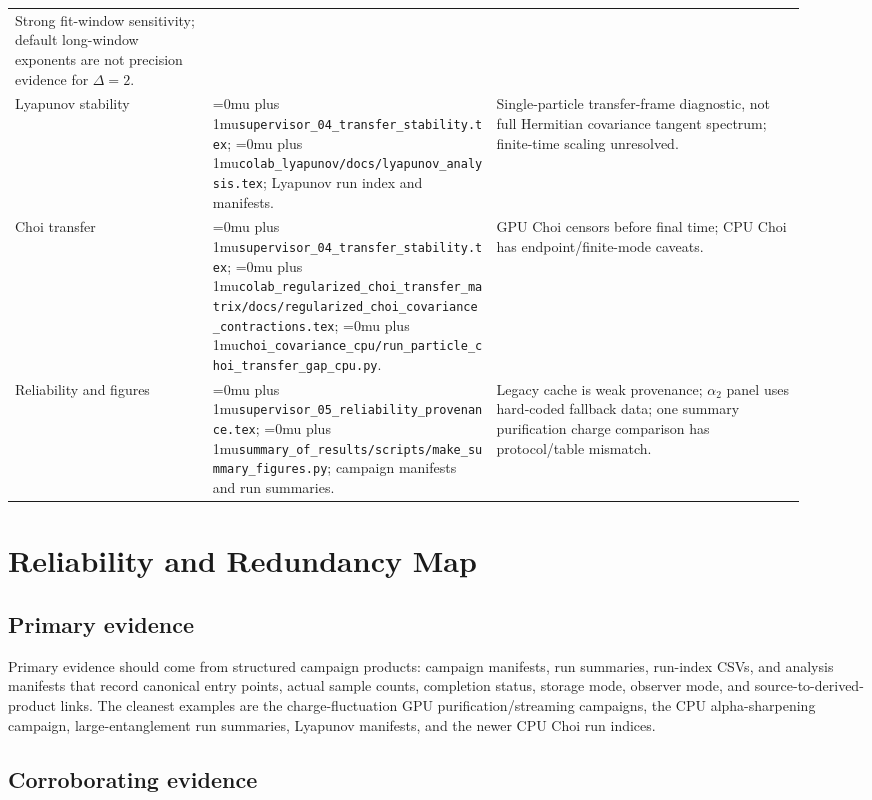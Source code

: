 \documentclass[aps,prb,onecolumn,nofootinbib,superscriptaddress]{revtex4-2}
\newcommand{\src}[1]{\begingroup\ttfamily\Urlmuskip=0mu plus 1mu\relax\nolinkurl{#1}\endgroup}
\begin{document}
\begin{table}[h]
\begin{ruledtabular}
\begin{tabular}{p{0.23\linewidth}p{0.33\linewidth}p{0.36\linewidth}}
Strong fit-window sensitivity; default long-window exponents are not precision evidence for \(\Delta=2\). \\
Lyapunov stability &
\src{supervisor_04_transfer_stability.tex}; \src{colab_lyapunov/docs/lyapunov_analysis.tex}; Lyapunov run index and manifests. &
Single-particle transfer-frame diagnostic, not full Hermitian covariance tangent spectrum; finite-time scaling unresolved. \\
Choi transfer &
\src{supervisor_04_transfer_stability.tex}; \src{colab_regularized_choi_transfer_matrix/docs/regularized_choi_covariance_contractions.tex}; \src{choi_covariance_cpu/run_particle_choi_transfer_gap_cpu.py}. &
GPU Choi censors before final time; CPU Choi has endpoint/finite-mode caveats. \\
Reliability and figures &
\src{supervisor_05_reliability_provenance.tex}; \src{summary_of_results/scripts/make_summary_figures.py}; campaign manifests and run summaries. &
Legacy cache is weak provenance; \(\alpha_2\) panel uses hard-coded fallback data; one summary purification charge comparison has protocol/table mismatch. \\
\end{tabular}
\end{ruledtabular}
\end{table}

\section{Reliability and Redundancy Map}

\subsection{Primary evidence}

Primary evidence should come from structured campaign products: campaign manifests, run summaries, run-index CSVs, and analysis manifests that record canonical entry points, actual sample counts, completion status, storage mode, observer mode, and source-to-derived-product links.  The cleanest examples are the charge-fluctuation GPU purification/streaming campaigns, the CPU alpha-sharpening campaign, large-entanglement run summaries, Lyapunov manifests, and the newer CPU Choi run indices.

\subsection{Corroborating evidence}
\end{document}
